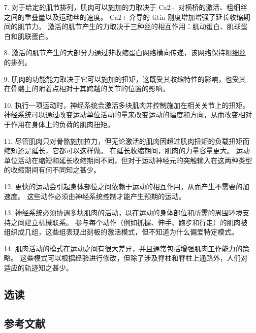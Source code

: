 7. 对于给定的肌节排列，肌肉可以施加的力取决于 Ca2+ 对横桥的激活、粗细丝之间的重叠量以及运动丝的速度。 Ca2+ 介导的 titin 刚度增加增强了延长收缩期间的肌节力。 激活的肌节产生的力取决于三种丝的相互作用：肌动蛋白、肌球蛋白和肌联蛋白。 

8. 激活的肌节产生的大部分力通过非收缩蛋白网络横向传递，该网络保持粗细丝的排列。 

9. 肌肉的功能能力取决于它可以施加的扭矩，这既受其收缩特性的影响，也受其在骨骼上的附着点相对于其跨越的关节的位置的影响。 

10. 执行一项运动时，神经系统会激活多块肌肉并控制施加在相关关节上的扭矩。 神经系统可以通过改变运动单位活动的量来改变运动的幅度和方向，从而改变相对于作用在身体上的负荷的肌肉扭矩。 

11. 尽管肌肉只对骨骼施加拉力，但无论激活的肌肉因超过肌肉扭矩的负载扭矩而缩短还是延长，它都可以这样做。 在延长收缩期间，肌肉的力量容量更大。 运动单位活动在缩短和延长收缩期间不同，但对于运动神经元的突触输入在这两种类型的收缩期间有何不同知之甚少。 

12. 更快的运动会引起身体部位之间依赖于运动的相互作用，从而产生不需要的加速度。 这些动作必须由神经系统控制才能产生预期的运动。 

13. 神经系统必须协调多块肌肉的活动，以在运动的身体部位和所需的周围环境支持之间建立机械联系。 参与每个动作（例如抓握、伸手、跑步和行走）的肌肉被组织成几组，这些组表现出刻板的激活模式，但不知道为什么偏爱特定模式。 

14. 肌肉活动的模式在运动之间有很大差异，并且通常包括增强肌肉工作能力的策略。 这些模式可以根据经验进行修改，但除了涉及脊柱和脊柱上通路外，人们对适应的轨迹知之甚少。

\subsection{选读}
\subsection{参考文献}
